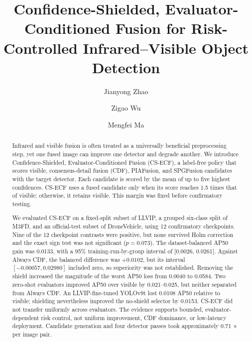 \documentclass[preprint,11pt]{elsarticle}
\begin{document}
\sloppy

\begin{frontmatter}

\title{Confidence-Shielded, Evaluator-Conditioned Fusion for Risk-Controlled Infrared--Visible Object Detection}

\author[AUTHOR]{Jianyong Zhao}

\author[AUTHOR]{Zigao Wu}

\author[AUTHOR]{Mengfei Ma}


\begin{abstract}
Infrared and visible fusion is often treated as a universally beneficial
preprocessing step, yet one fused image can improve one detector and degrade
another. We introduce
Confidence-Shielded, Evaluator-Conditioned Fusion (CS-ECF), a label-free policy
that scores visible, consensus-detail fusion (CDF), PIAFusion, and SPGFusion
candidates with the target detector. Each candidate is scored by the mean of
up to five highest confidences. CS-ECF uses a fused candidate only when its score
reaches 1.5 times that of visible; otherwise, it retains visible. This margin
was fixed before confirmatory testing.

We evaluated CS-ECF on a fixed-split subset of LLVIP, a grouped six-class split
of M3FD, and an official-test subset of DroneVehicle, using 12 confirmatory
checkpoints. Nine of the 12 checkpoint contrasts were positive, but none
survived Holm correction and the exact sign test was not significant
(\(p=0.073\)). The dataset-balanced AP50 gain was 0.0133, with a 95\%
training-run-by-group interval of [0.0026, 0.0261]. Against Always CDF, the
balanced difference was \(+0.0102\), but its interval
\([-0.00057, 0.02980]\) included zero, so superiority was not established.
Removing the shield increased the magnitude of the worst AP50 loss from 0.0040
to 0.0584. Two zero-shot evaluators improved AP50 over visible by
0.021--0.025, but neither separated from Always CDF. An
LLVIP-fine-tuned YOLOv9t lost 0.0108 AP50 relative to visible; shielding
nevertheless improved the no-shield selector by 0.0153. CS-ECF did
not transfer uniformly across evaluators. The
evidence supports bounded, evaluator-dependent risk control, not uniform
improvement, CDF dominance, or low-latency deployment. Candidate generation and
four detector passes took approximately \SI{0.71}{s} per image pair.
\end{abstract}


\end{frontmatter}
\end{document}
